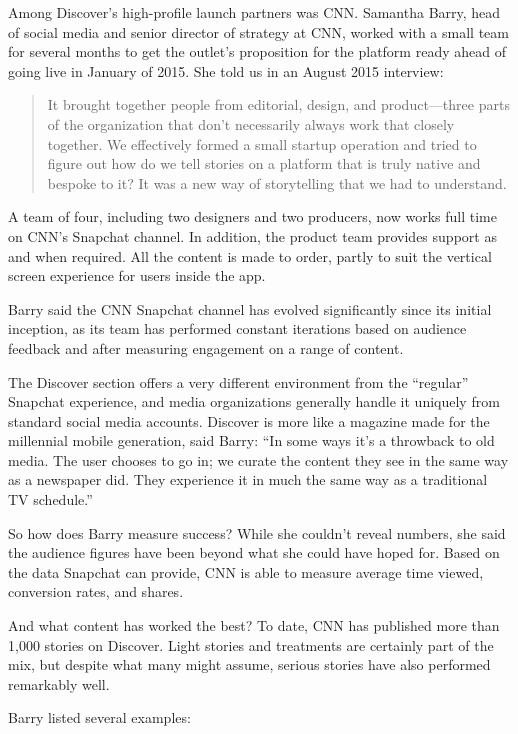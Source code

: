 \documentclass[notoc, symmetric, nobib, nols]{towcenter-guideto-book}
\begin{document}
Among Discover's high-profile launch partners was CNN. Samantha Barry, head of social media and senior director of strategy at CNN, worked with a small team for several months to get the outlet's proposition for the platform ready ahead of going live in January of 2015. She told us in an August 2015 interview: 

\begin{quote}
It brought together people from editorial, design, and product---three parts of the organization that don't necessarily always work that closely together. We effectively formed a small startup operation and tried to figure out how do we tell stories on a platform that is truly native and bespoke to it? It was a new way of storytelling that we had to understand. 
\end{quote}

A team of four, including two designers and two producers, now works full time on CNN's Snapchat channel. In addition, the product team provides support as and when required. All the content is made to order, partly to suit the vertical screen experience for users inside the app. 

Barry said the CNN Snapchat channel has evolved significantly since its initial inception, as its team has performed constant iterations based on audience feedback and after measuring engagement on a range of content. 

The Discover section offers a very different environment from the ``regular'' Snapchat experience, and media organizations generally handle it uniquely from standard social media accounts. Discover is more like a magazine made for the millennial mobile generation, said Barry: ``In some ways it's a throwback to old media. The user chooses to go in; we curate the content they see in the same way as a newspaper did. They experience it in much the same way as a traditional TV schedule.''

So how does Barry measure success? While she couldn't reveal numbers, she said the audience figures have been beyond what she could have hoped for. Based on the data Snapchat can provide, CNN is able to measure average time viewed, conversion rates, and shares. 

And what content has worked the best? To date, CNN has published more than 1,000 stories on Discover. Light stories and treatments are certainly part of the mix, but despite what many might assume, serious stories have also performed remarkably well.

Barry listed several examples: 
\end{document}
